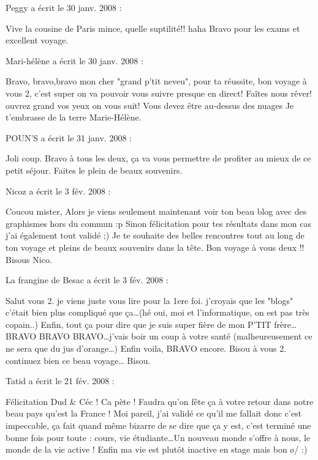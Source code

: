 \medskip
Peggy a écrit le 30 janv. 2008 :
\begin{displayquote}
Vive la cousine de Paris mince, quelle suptilité!! haha
Bravo pour les exams et excellent voyage.
\end{displayquote}

\medskip
Mari-hélène a écrit le 30 janv. 2008 :
\begin{displayquote}
Bravo, bravo,bravo mon cher "grand p'tit neveu", pour ta réussite, bon voyage à vous 2, c'est super on va pouvoir vous suivre presque en direct! Faîtes nous rêver! ouvrez grand vos yeux on vous suit!
Vous devez être au-dessus des nuages
Je t'embrasse de la terre
Marie-Hélène.
\end{displayquote}

\medskip
POUN'S a écrit le 31 janv. 2008 :
\begin{displayquote}
Joli coup.
Bravo à tous les deux, ça va vous permettre de profiter au mieux de ce petit séjour. Faites le plein de beaux souvenirs.
\end{displayquote}

\medskip
Nicoz a écrit le 3 fév. 2008 :
\begin{displayquote}
Coucou mister,
Alors je viens seulement maintenant voir ton beau blog avec des graphismes hors du commun :p
Sinon félicitation pour tes résultats dans mon cas j'ai également tout validé ;)
Je te souhaite des belles rencontres tout au long de ton voyage et pleins de beaux souvenirs dans la tête.
Bon voyage à vous deux !!
Bisous
Nico.
\end{displayquote}

\medskip
La frangine de Besac a écrit le 3 fév. 2008 :
\begin{displayquote}
Salut vous 2. je viens juste vous lire pour la 1ere foi. j'croyais que les "blogs" c'était bien plus compliqué que ça\dots (hé oui, moi et l'informatique, on est pas très copain..)
Enfin, tout ça pour dire que je suis super fière de mon P'TIT frère\dots BRAVO BRAVO BRAVO\dots j'vais boir un coup à votre santé (malheureusement ce ne sera que du jus d'orange\dots)
Enfin voila, BRAVO encore.
Bisou à vous 2. continuez bien ce beau voyage\dots
Bisou.
\end{displayquote}

\medskip
Tatid a écrit le 21 fév. 2008 :
\begin{displayquote}
Félicitation Dud \& Céc ! Ca pète !
Faudra qu'on fête ça à votre retour dans notre beau pays qu'est la France !
Moi pareil, j'ai validé ce qu'il me fallait donc c'est impeccable, ça fait quand même bizarre de se dire que ça y est, c'est terminé une bonne fois pour toute : cours, vie étudiante\dots Un nouveau monde s'offre à nous, le monde de la vie active ! Enfin ma vie est plutôt inactive en stage mais bon \o/ :)
\end{displayquote}

\vfill
